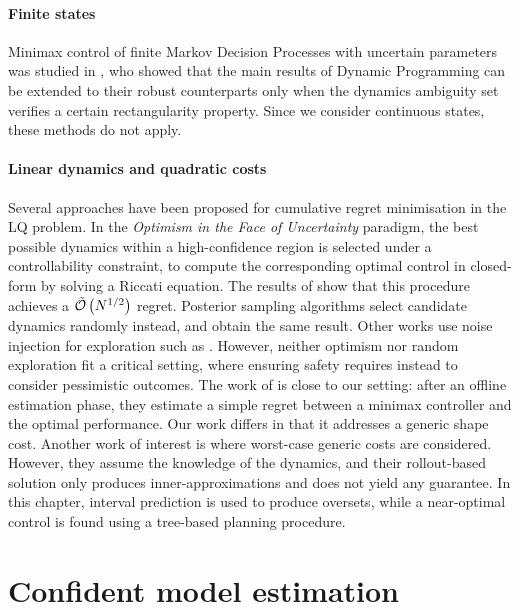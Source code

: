 \paragraph{Finite states} Minimax control of finite Markov Decision Processes with uncertain parameters was studied in \citep{Iyengar2005,Nilim2005,Wiesemann2013}, who showed that the main results of Dynamic Programming can be extended to their robust counterparts only when the dynamics ambiguity set verifies a certain rectangularity property. Since we consider continuous states, these methods do not apply.

\paragraph{Linear dynamics and quadratic costs} Several approaches have been proposed for cumulative regret minimisation in the LQ problem. In the \emph{Optimism in the Face of Uncertainty} paradigm, the best possible dynamics within a high-confidence region is selected under a controllability constraint, to compute the corresponding optimal control in closed-form by solving a Riccati equation. The results of 	\citep{abbasi-yadkori11a,Ibrahimi2013,Faradonbeh2020} show that this procedure achieves a $\tilde{\mathcal{O}}\left(N^{1/2}\right)$ regret. Posterior sampling algorithms \citep{Ouyang2017,abeille18a} select candidate dynamics randomly instead, and obtain the same result. Other works use noise injection for exploration such as \citep{Dean2019,Dean2018}. However, neither optimism nor random exploration fit a critical setting, where ensuring safety requires instead to consider pessimistic outcomes. The work of \citet{Dean2019} is close to our setting: after an offline estimation phase, they estimate a simple regret between a minimax controller and the optimal performance. Our work differs in that it addresses a generic shape cost. 
Another work of interest is \citep{Rosolia2019} where worst-case generic costs are considered. However, they assume the knowledge of the dynamics, and their rollout-based solution only produces inner-approximations and does not yield any guarantee. In this chapter, interval prediction is used to produce oversets, while a near-optimal control is found using a tree-based planning procedure.


\section{Confident model estimation}
\label{sec:estimation}

